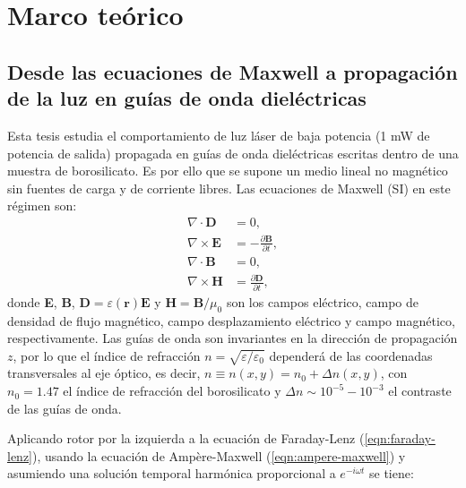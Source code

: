 \chapter{Marco teórico}

\section{Desde las ecuaciones de Maxwell a propagación de la luz en guías de onda dieléctricas}

Esta tesis estudia el comportamiento de luz láser de baja potencia (1 mW de potencia de salida) propagada en guías de onda dieléctricas escritas dentro de una muestra de borosilicato. Es por ello que se supone un medio lineal no magnético sin fuentes de carga y de corriente libres. Las ecuaciones de Maxwell (SI) en este régimen son:
\begin{align}
	\nabla\cdot\textbf{D} &= 0, \label{eqn:gauss}
	\\	
	\nabla\times\textbf{E} &= -\frac{\partial \textbf{B}}{\partial t}, \label{eqn:faraday-lenz}
	\\	
	\nabla\cdot\textbf{B} &= 0, \label{eqn:div0}
	\\	
	\nabla\times\textbf{H} &= \frac{\partial \textbf{D}}{\partial t}, \label{eqn:ampere-maxwell}
\end{align}
donde \textbf{E}, \textbf{B}, $\textbf{D}=\varepsilon(\textbf{r})\textbf{E}$ y $\textbf{H}=\textbf{B}/\mu_0$ son los campos eléctrico, campo de densidad de flujo magnético, campo desplazamiento eléctrico y campo magnético, respectivamente. Las guías de onda son invariantes en la dirección de propagación $z$, por lo que el índice de refracción $n=\sqrt{\varepsilon/\varepsilon_0}$ dependerá de las coordenadas transversales al eje óptico, es decir, $n \equiv n(x,y) = n_0 + \Delta n(x,y)$, con $n_0=1.47$ el índice de refracción del borosilicato y $\Delta n \sim 10^{-5}-10^{-3}$ el contraste de las guías de onda.

Aplicando rotor por la izquierda a la ecuación de Faraday-Lenz (\ref{eqn:faraday-lenz}), usando la ecuación de Ampère-Maxwell (\ref{eqn:ampere-maxwell}) y asumiendo una solución temporal harmónica proporcional a $e^{-i\omega t}$ se tiene:

